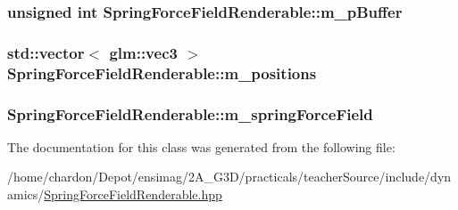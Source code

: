 \hypertarget{classSpringForceFieldRenderable_aff6f71fa77becfdbc5a14b6ff2701e8c}{
\subsubsection[{m\+\_\+p\+Buffer}]{\setlength{\rightskip}{0pt plus 5cm}unsigned int Spring\+Force\+Field\+Renderable\+::m\+\_\+p\+Buffer\hspace{0.3cm}{\ttfamily [private]}}}\label{classSpringForceFieldRenderable_aff6f71fa77becfdbc5a14b6ff2701e8c}
\hypertarget{classSpringForceFieldRenderable_a09d7a928050183560e66aec4cad6c616}{
\subsubsection[{m\+\_\+positions}]{\setlength{\rightskip}{0pt plus 5cm}std\+::vector$<$ glm\+::vec3 $>$ Spring\+Force\+Field\+Renderable\+::m\+\_\+positions\hspace{0.3cm}{\ttfamily [private]}}}\label{classSpringForceFieldRenderable_a09d7a928050183560e66aec4cad6c616}
\hypertarget{classSpringForceFieldRenderable_aa19b3084a552a59ceebf51ed5be92ea6}{
\subsubsection[{m\+\_\+spring\+Force\+Field}]{ Spring\+Force\+Field\+Renderable\+::m\+\_\+spring\+Force\+Field\hspace{0.3cm}{\ttfamily [private]}}}\label{classSpringForceFieldRenderable_aa19b3084a552a59ceebf51ed5be92ea6}


The documentation for this class was generated from the following file\+:\begin{DoxyCompactItemize}
\item 
/home/chardon/\+Depot/ensimag/2\+A\+\_\+\+G3\+D/practicals/teacher\+Source/include/dynamics/\hyperlink{SpringForceFieldRenderable_8hpp}{Spring\+Force\+Field\+Renderable.\+hpp}\end{DoxyCompactItemize}
